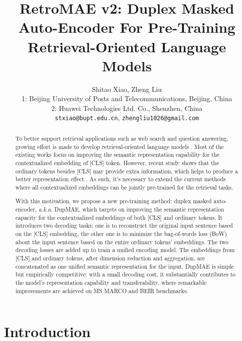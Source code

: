 \documentclass[11pt,a4paper]{article}
\title{RetroMAE v2: Duplex Masked Auto-Encoder For Pre-Training Retrieval-Oriented Language Models}
\author{Shitao Xiao, Zheng Liu \\
  1: Beijing University of Posts and Telecommunications, Beijing, China \\ 
  2: Huawei Technologies Ltd. Co., Shenzhen, China \\
  \texttt{stxiao@bupt.edu.cn}, 
  \texttt{zhengliu1026@gmail.com}
}
\begin{document}
\maketitle 




\begin{abstract}
To better support retrieval applications such as web search and question answering, growing effort is made to develop retrieval-oriented language models \cite{gao2021condenser,wang2021tsdae,liu2022retromae}. 
Most of the existing works focus on improving the semantic representation capability for the contextualized embedding of [CLS] token. However, recent study shows that the ordinary tokens besides [CLS] may provide extra information, which helps to produce a better representation effect \cite{lin2022aggretriever}. As such, it's necessary to extend the current methods where all contextualized embeddings can be jointly pre-trained for the retrieval tasks. 



With this motivation, we propose a new pre-training method: duplex masked auto-encoder, \textit{a.k.a.} DupMAE, which targets on improving the semantic representation capacity for the contextualized embeddings of both [CLS] and ordinary tokens. It introduces two decoding tasks: one is to reconstruct the original input sentence based on the [CLS] embedding, the other one is to minimize the bag-of-words loss (BoW) about the input sentence based on the entire ordinary tokens' embeddings. The two decoding losses are added up to train a unified encoding model. The embeddings from [CLS] and ordinary tokens, after dimension reduction and aggregation, are concatenated as one unified semantic representation for the input. DupMAE is simple but empirically competitive: with a small decoding cost, it substantially contributes to the model's representation capability and transferability, where remarkable improvements are achieved on MS MARCO and BEIR benchmarks. 







\end{abstract} 

\section{Introduction}
\end{document}
